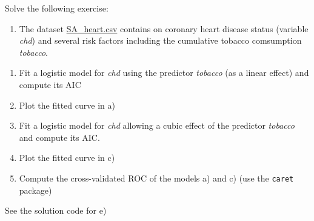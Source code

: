 \documentclass[
]{book}
\providecommand{\tightlist}{%
  \setlength{\itemsep}{0pt}\setlength{\parskip}{0pt}}
\begin{document}
Solve the following exercise:

\begin{enumerate}
\def\labelenumi{\arabic{enumi})}
\tightlist
\item
  The dataset \href{https://www.dropbox.com/s/cwkw3p91zyizcqz/SA_heart.csv?dl=1}{SA\_heart.csv}
  contains on coronary heart disease status (variable \emph{chd}) and several risk
  factors including the cumulative tobacco comsumption \emph{tobacco}.
\end{enumerate}

\begin{enumerate}
\def\labelenumi{\alph{enumi})}
\item
  Fit a logistic model for \emph{chd} using the predictor \emph{tobacco}
  (as a linear effect) and compute its AIC
\item
  Plot the fitted curve in a)
\item
  Fit a logistic model for \emph{chd} allowing a cubic effect of the
  predictor \emph{tobacco} and compute its AIC.
\item
  Plot the fitted curve in c)
\item
  Compute the cross-validated ROC of the models a) and c) (use the \texttt{caret}
  package)
\end{enumerate}

See the solution code for e)
\end{document}
